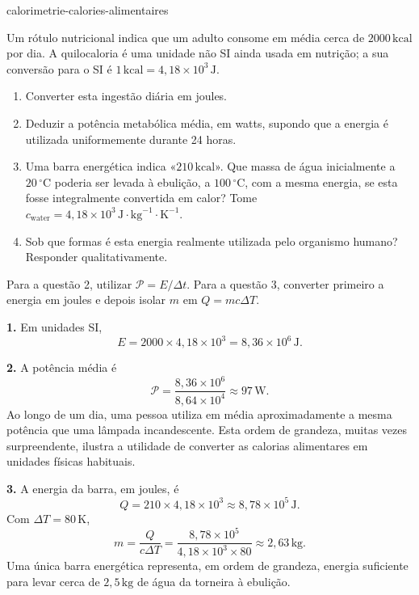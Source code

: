\begin{exo}{calorimetrie-calories-alimentaires}

Um rótulo nutricional indica que um adulto consome em média cerca de $2000\,\text{kcal}$ por dia. A quilocaloria é uma unidade não SI ainda usada em nutrição; a sua conversão para o SI é $1\,\text{kcal}=4{,}18\times10^3\,\text{J}$.

\begin{enumerate}
  \item Converter esta ingestão diária em joules.
  \item Deduzir a potência metabólica média, em watts, supondo que a energia é utilizada uniformemente durante 24 horas.
  \item Uma barra energética indica «$210\,\text{kcal}$». Que massa de água inicialmente a $20\,^\circ\text{C}$ poderia ser levada à ebulição, a $100\,^\circ\text{C}$, com a mesma energia, se esta fosse integralmente convertida em calor? Tome $c_{\text{water}}=4{,}18\times10^3\,\text{J}\!\cdot\!\text{kg}^{-1}\!\cdot\!\text{K}^{-1}$.
  \item Sob que formas é esta energia realmente utilizada pelo organismo humano? Responder qualitativamente.
\end{enumerate}

\begin{indication}
Para a questão 2, utilizar $\mathcal P=E/\Delta t$. Para a questão 3, converter primeiro a energia em joules e depois isolar $m$ em $Q=mc\Delta T$.
\end{indication}

\begin{solution}
\textbf{1.} Em unidades SI,
\[
E=2000\times4{,}18\times10^3=8{,}36\times10^6\,\text{J}.
\]

\textbf{2.} A potência média é
\[
\mathcal P=\frac{8{,}36\times10^6}{8{,}64\times10^4}\approx97\,\text{W}.
\]
Ao longo de um dia, uma pessoa utiliza em média aproximadamente a mesma potência que uma lâmpada incandescente. Esta ordem de grandeza, muitas vezes surpreendente, ilustra a utilidade de converter as calorias alimentares em unidades físicas habituais.

\textbf{3.} A energia da barra, em joules, é
\[
Q=210\times4{,}18\times10^3\approx8{,}78\times10^5\,\text{J}.
\]
Com $\Delta T=80\,\text{K}$,
\[
m=\frac{Q}{c\Delta T}
=\frac{8{,}78\times10^5}{4{,}18\times10^3\times80}
\approx2{,}63\,\text{kg}.
\]
Uma única barra energética representa, em ordem de grandeza, energia suficiente para levar cerca de $2{,}5\,\text{kg}$ de água da torneira à ebulição.


\end{solution}
\end{exo}
